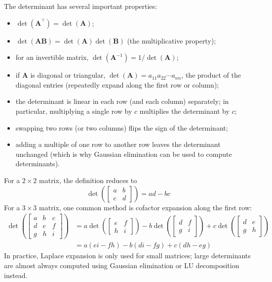 The determinant has several important properties:
\begin{itemize}
    \item $ \det(\mathbf{A}^\top) = \det(\mathbf{A}) $;
    \item $ \det(\mathbf{AB}) = \det(\mathbf{A})\det(\mathbf{B}) $ (the multiplicative property);
    \item for an invertible matrix, $ \det(\mathbf{A}^{-1}) = 1 / \det(\mathbf{A}) $;
    \item if $ \mathbf{A} $ is diagonal or triangular, $ \det(\mathbf{A}) = a_{11} a_{22} \cdots a_{nn} $, the product of the diagonal entries (repeatedly expand along the first row or column);
    \item the determinant is linear in each row (and each column) separately; in particular, multiplying a single row by $c$ multiplies the determinant by $c$;
    \item swapping two rows (or two columns) flips the sign of the determinant;
    \item adding a multiple of one row to another row leaves the determinant unchanged (which is why Gaussian elimination can be used to compute determinants).
\end{itemize}

For a $2\times 2$ matrix, the definition reduces to
\begin{equation*}
    \det\!\left(\begin{bmatrix} a & b \\ c & d \end{bmatrix}\right) = ad - bc
\end{equation*}
For a $3\times 3$ matrix, one common method is cofactor expansion along the first row:
\begin{align*}
    \det\!\left(\begin{bmatrix} a & b & c \\ d & e & f \\ g & h & i \end{bmatrix}\right) &= a \det\!\left(\begin{bmatrix} e & f \\ h & i \end{bmatrix}\right) - b \det\!\left(\begin{bmatrix} d & f \\ g & i \end{bmatrix}\right) + c \det\!\left(\begin{bmatrix} d & e \\ g & h \end{bmatrix}\right) \\ &= a(ei - fh) - b(di - fg) + c(dh - eg)
\end{align*}
In practice, Laplace expansion is only used for small matrices; large determinants are almost always computed using Gaussian elimination or LU decomposition instead.


